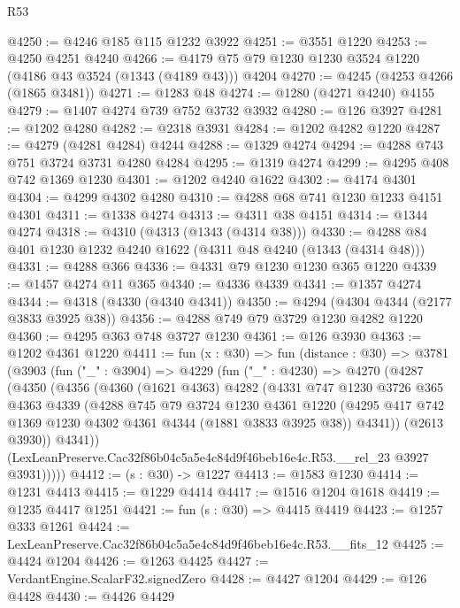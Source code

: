 \begin{lexlean}{R53}
\begin{coremodule}
@4250 := @4246 @185 @115 @1232 @3922
@4251 := @3551 @1220
@4253 := @4250 @4251 @4240
@4266 := @4179 @75 @79 @1230 @1230 @3524 @1220 (@4186 @43 @3524 (@1343 (@4189 @43))) @4204
@4270 := @4245 (@4253 @4266 (@1865 @3481))
@4271 := @1283 @48
@4274 := @1280 (@4271 @4240) @4155
@4279 := @1407 @4274 @739 @752 @3732 @3932
@4280 := @126 @3927
@4281 := @1202 @4280
@4282 := @2318 @3931
@4284 := @1202 @4282 @1220
@4287 := @4279 (@4281 @4284) @4244
@4288 := @1329 @4274
@4294 := @4288 @743 @751 @3724 @3731 @4280 @4284
@4295 := @1319 @4274
@4299 := @4295 @408 @742 @1369 @1230
@4301 := @1202 @4240 @1622
@4302 := @4174 @4301
@4304 := @4299 @4302 @4280
@4310 := @4288 @68 @741 @1230 @1233 @4151 @4301
@4311 := @1338 @4274
@4313 := @4311 @38 @4151
@4314 := @1344 @4274
@4318 := @4310 (@4313 (@1343 (@4314 @38)))
@4330 := @4288 @84 @401 @1230 @1232 @4240 @1622 (@4311 @48 @4240 (@1343 (@4314 @48)))
@4331 := @4288 @366
@4336 := @4331 @79 @1230 @1230 @365 @1220
@4339 := @1457 @4274 @11 @365
@4340 := @4336 @4339
@4341 := @1357 @4274
@4344 := @4318 (@4330 (@4340 @4341))
@4350 := @4294 (@4304 @4344 (@2177 @3833 @3925 @38))
@4356 := @4288 @749 @79 @3729 @1230 @4282 @1220
@4360 := @4295 @363 @748 @3727 @1230
@4361 := @126 @3930
@4363 := @1202 @4361 @1220
@4411 := fun (x : @30) =>
  fun (distance : @30) =>
  @3781
    (@3903
      (fun ("_" : @3904) =>
      @4229
        (fun ("_" : @4230) =>
        @4270
          (@4287
            (@4350
              (@4356
                (@4360
                  (@1621 @4363)
                  @4282
                  (@4331
                    @747
                    @1230
                    @3726
                    @365
                    @4363
                    @4339
                    (@4288
                      @745
                      @79
                      @3724
                      @1230
                      @4361
                      @1220
                      (@4295 @417 @742 @1369 @1230 @4302 @4361 @4344 (@1881 @3833 @3925 @38))
                      @4341))
                  (@2613 @3930))
                @4341))
            (LexLeanPreserve.Cac32f86b04c5a5e4c84d9f46beb16e4c.R53.__rel_23 @3927 @3931)))))
@4412 := (s : @30) -> @1227
@4413 := @1583 @1230
@4414 := @1231 @4413
@4415 := @1229 @4414
@4417 := @1516 @1204 @1618
@4419 := @1235 @4417 @1251
@4421 := fun (s : @30) => @4415 @4419
@4423 := @1257 @333 @1261
@4424 := LexLeanPreserve.Cac32f86b04c5a5e4c84d9f46beb16e4c.R53.__fits_12
@4425 := @4424 @1204
@4426 := @1263 @4425
@4427 := VerdantEngine.ScalarF32.signedZero
@4428 := @4427 @1204
@4429 := @126 @4428
@4430 := @4426 @4429

\end{coremodule}
\end{lexlean}
